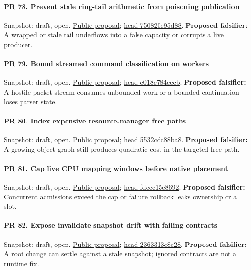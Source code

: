 \paragraph{PR 78. Prevent stale ring-tail arithmetic from poisoning publication}
\readcode Snapshot: draft, open.
\href{\repobase/pull/78}{Public proposal};
\href{\repobase/commit/750820e95d88f9f975aa95dbd25edc2e3ed737d7}{head 750820e95d88}.
\textbf{Proposed falsifier:} A wrapped or stale tail underflows into a false capacity or corrupts a
  live producer.

\paragraph{PR 79. Bound streamed command classification on workers}
\readcode Snapshot: draft, open.
\href{\repobase/pull/79}{Public proposal};
\href{\repobase/commit/e018e784cecba94f8a6c43ab0ebc5388271ed5fb}{head e018e784cecb}.
\textbf{Proposed falsifier:} A hostile packet stream consumes unbounded work or a bounded
  continuation loses parser state.

\paragraph{PR 80. Index expensive resource-manager free paths}
\readcode Snapshot: draft, open.
\href{\repobase/pull/80}{Public proposal};
\href{\repobase/commit/5532cdc88ba8b3e4513aafd54ab095aac906b659}{head 5532cdc88ba8}.
\textbf{Proposed falsifier:} A growing object graph still produces quadratic cost in the targeted
  free path.

\paragraph{PR 81. Cap live CPU mapping windows before native placement}
\readcode Snapshot: draft, open.
\href{\repobase/pull/81}{Public proposal};
\href{\repobase/commit/fdccc15e869253f3bfdd1ba0e0da73d150fe2489}{head fdccc15e8692}.
\textbf{Proposed falsifier:} Concurrent admissions exceed the cap or failure rollback leaks
  ownership or a slot.

\paragraph{PR 82. Expose invalidate snapshot drift with failing contracts}
\readcode Snapshot: draft, open.
\href{\repobase/pull/82}{Public proposal};
\href{\repobase/commit/2363313c8c280fbd0d607542f834fa563bc0b16f}{head 2363313c8c28}.
\textbf{Proposed falsifier:} A root change can settle against a stale snapshot; ignored contracts
  are not a runtime fix.

